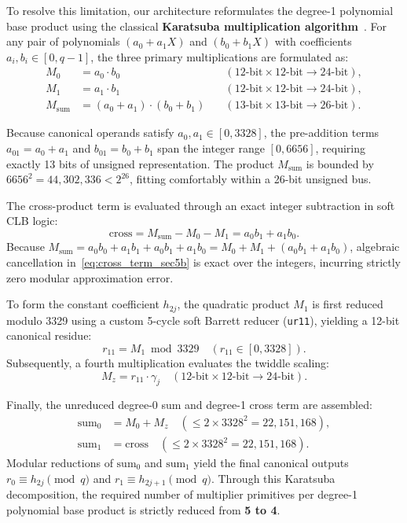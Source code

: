 To resolve this limitation, our architecture reformulates the degree-1 polynomial base product using the classical \textbf{Karatsuba multiplication algorithm}~\cite{karatsuba1962}. For any pair of polynomials $(a_0 + a_1 X)$ and $(b_0 + b_1 X)$ with coefficients $a_i, b_i \in [0, q-1]$, the three primary multiplications are formulated as:
\begin{align}
M_0 &= a_0 \cdot b_0 \quad &(12\text{-bit} \times 12\text{-bit} \to 24\text{-bit}), \label{eq:m0_def} \\
M_1 &= a_1 \cdot b_1 \quad &(12\text{-bit} \times 12\text{-bit} \to 24\text{-bit}), \label{eq:m1_def} \\
M_{\text{sum}} &= (a_0 + a_1) \cdot (b_0 + b_1) \quad &(13\text{-bit} \times 13\text{-bit} \to 26\text{-bit}). \label{eq:msum_def}
\end{align}

Because canonical operands satisfy $a_0, a_1 \in [0, 3328]$, the pre-addition terms $a_{01} = a_0 + a_1$ and $b_{01} = b_0 + b_1$ span the integer range $[0, 6656]$, requiring exactly 13 bits of unsigned representation. The product $M_{\text{sum}}$ is bounded by $6656^2 = 44,302,336 < 2^{26}$, fitting comfortably within a 26-bit unsigned bus.

The cross-product term is evaluated through an exact integer subtraction in soft CLB logic:
\begin{equation}
\label{eq:cross_term_sec5b}
\text{cross} = M_{\text{sum}} - M_0 - M_1 = a_0 b_1 + a_1 b_0.
\end{equation}
Because $M_{\text{sum}} = a_0 b_0 + a_1 b_1 + a_0 b_1 + a_1 b_0 = M_0 + M_1 + (a_0 b_1 + a_1 b_0)$, algebraic cancellation in~\eqref{eq:cross_term_sec5b} is exact over the integers, incurring strictly zero modular approximation error.

To form the constant coefficient $h_{2j}$, the quadratic product $M_1$ is first reduced modulo 3329 using a custom 5-cycle soft Barrett reducer (\texttt{ur11}), yielding a 12-bit canonical residue:
\begin{equation}
r_{11} = M_1 \bmod 3329 \quad (r_{11} \in [0, 3328]).
\end{equation}
Subsequently, a fourth multiplication evaluates the twiddle scaling:
\begin{equation}
M_z = r_{11} \cdot \gamma_j \quad (12\text{-bit} \times 12\text{-bit} \to 24\text{-bit}).
\end{equation}

Finally, the unreduced degree-0 sum and degree-1 cross term are assembled:
\begin{align}
\text{sum}_0 &= M_0 + M_z \quad (\le 2 \times 3328^2 = 22,151,168), \label{eq:sum0_def_sec5b} \\
\text{sum}_1 &= \text{cross} \quad (\le 2 \times 3328^2 = 22,151,168). \label{eq:sum1_def_sec5b}
\end{align}
Modular reductions of $\text{sum}_0$ and $\text{sum}_1$ yield the final canonical outputs $r_0 \equiv h_{2j} \pmod q$ and $r_1 \equiv h_{2j+1} \pmod q$. Through this Karatsuba decomposition, the required number of multiplier primitives per degree-1 polynomial base product is strictly reduced from \textbf{5 to 4}.

